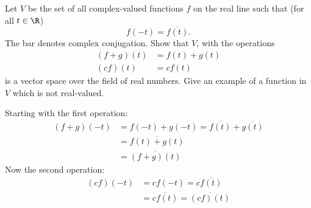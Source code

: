 \documentclass[11pt]{article}
\begin{document}
\begin{homeworkProblem}

    Let $V$ be the set of all complex-valued functions $f$ on the real line such that (for all $t \in \R$)
    \[
        f(-t) = \overline{f(t)}.
    \]
    The bar denotes complex conjugation. Show that $V$, with the operations
    \begin{align*}
        (f+g)(t) & = f(t) + g(t) \\
        (cf)(t)  & = c f(t)
    \end{align*}
    is a vector space over the field of real numbers. Give an example of a function in $V$ which is
    not real-valued. \\

    \solution

    Starting with the first operation:
    \begin{align*}
        (f + g)(-t) & = f(-t) + g(-t) = \overline{f(t)} + \overline{g(t)} \\
                    & = \overline{f(t) + g(t)}                            \\
                    & = \overline{(f + g)(t)}
    \end{align*}
    Now the second operation:
    \begin{align*}
        (cf)(-t) & = c f(-t)  = c \overline{f(t)}           \\
                 & = \overline{c f(t)} = \overline{(cf)(t)}
    \end{align*}

\end{homeworkProblem}

\pagebreak
\end{document}
